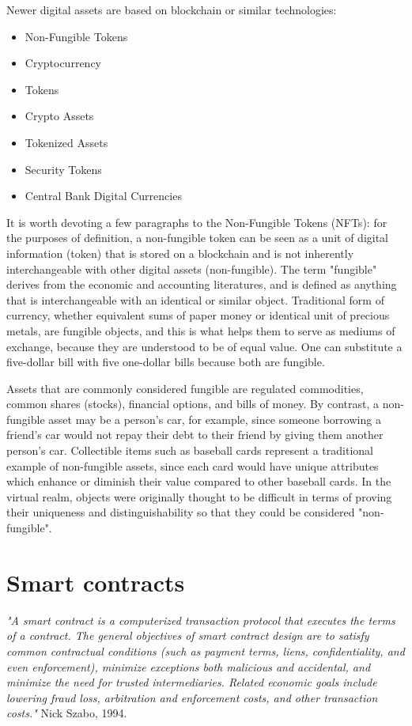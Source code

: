 \documentclass[MSE,Master,english]{twbook}%
\begin{document}
Newer digital assets are based on blockchain or similar technologies:
\begin{multicols}{2}
  \begin{itemize}
    \item Non-Fungible Tokens
    \item Cryptocurrency
    \item Tokens
    \item Crypto Assets
    \item Tokenized Assets
    \item Security Tokens
    \item Central Bank Digital Currencies
  \end{itemize}
\end{multicols}

It is worth devoting a few paragraphs to the Non-Fungible Tokens (\glspl{NFT}): for the purposes of definition, a non-fungible token\cite{nft} can be seen as a unit of digital information (token) that is stored on a blockchain and is not inherently interchangeable with other digital assets (non-fungible). The term "fungible" derives from the economic and accounting literatures, and is defined as anything that is interchangeable with an identical or similar object. Traditional form of currency, whether equivalent sums of paper money or identical unit of precious metals, are fungible objects, and this is what helps them to serve as mediums of exchange, because they are understood to be of equal value. One can substitute a five-dollar bill with five one-dollar bills because both are fungible.

Assets that are commonly considered fungible are regulated commodities, common shares (stocks), financial options, and bills of money. By contrast, a non-fungible asset may be a person's car, for example, since someone borrowing a friend's car would not repay their debt to their friend by giving them another person's car. Collectible items such as baseball cards represent a traditional example of non-fungible assets, since each card would have unique attributes which enhance or diminish their value compared to other baseball cards. In the virtual realm, objects were originally thought to be difficult in terms of proving their uniqueness and distinguishability so that they could be considered "non-fungible".

\section{Smart contracts\label{sm}}
\emph{"A smart contract is a computerized transaction protocol that executes the terms of a contract. The general objectives of smart contract design are to satisfy common contractual conditions (such as payment terms, liens, confidentiality, and even enforcement), minimize exceptions both malicious and accidental, and minimize the need for trusted intermediaries. Related economic goals include lowering fraud loss, arbitration and enforcement costs, and other transaction costs."} Nick Szabo, 1994.\cite{smartContracts} \\
\end{document}
